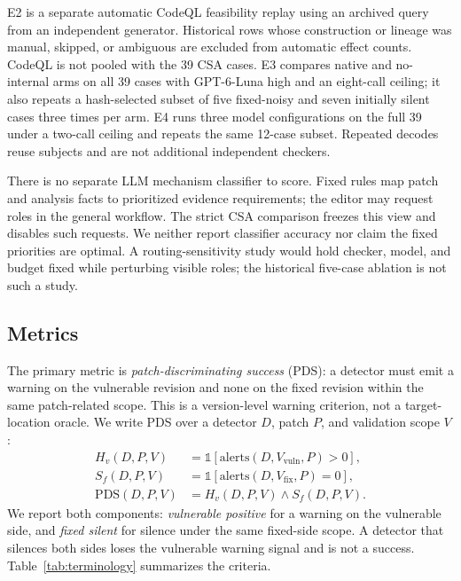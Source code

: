 E2 is a separate automatic CodeQL feasibility replay using an archived query from an independent generator. Historical rows whose construction or lineage was manual, skipped, or ambiguous are excluded from automatic effect counts. CodeQL is not pooled with the 39 CSA cases. E3 compares native and no-internal \toolname arms on all 39 cases with GPT-6-Luna high and an eight-call ceiling; it also repeats a hash-selected subset of five fixed-noisy and seven initially silent cases three times per arm. E4 runs three model configurations on the full 39 under a two-call ceiling and repeats the same 12-case subset. Repeated decodes reuse subjects and are not additional independent checkers.

There is no separate LLM mechanism classifier to score. Fixed rules map patch and analysis facts to prioritized evidence requirements; the editor may request roles in the general workflow. The strict CSA comparison freezes this view and disables such requests. We neither report classifier accuracy nor claim the fixed priorities are optimal. A routing-sensitivity study would hold checker, model, and budget fixed while perturbing visible roles; the historical five-case ablation is not such a study.

\subsection{Metrics}

The primary metric is \emph{patch-discriminating success} (PDS): a detector must emit a warning on the vulnerable revision and none on the fixed revision within the same patch-related scope. This is a version-level warning criterion, not a target-location oracle. We write PDS over a detector $D$, patch $P$, and validation scope $V$:
\begin{equation}
\begin{aligned}
H_v(D,P,V) &= \mathbb{1}[\mathrm{alerts}(D,V_{\mathrm{vuln}},P)>0],\\
S_f(D,P,V) &= \mathbb{1}[\mathrm{alerts}(D,V_{\mathrm{fix}},P)=0],\\
\mathrm{PDS}(D,P,V) &= H_v(D,P,V) \land S_f(D,P,V).
\end{aligned}
\label{eq:pds}
\end{equation}
We report both components: \emph{vulnerable positive} for a warning on the vulnerable side, and \emph{fixed silent} for silence under the same fixed-side scope. A detector that silences both sides loses the vulnerable warning signal and is not a success. Table~\ref{tab:terminology} summarizes the criteria.

